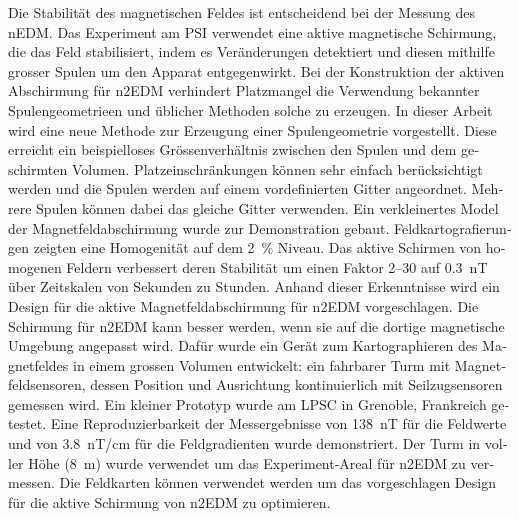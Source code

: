 \begin{otherlanguage}{german}
Die Stabilität des magnetischen Feldes ist entscheidend bei der Messung des nEDM\@.
Das Experiment am PSI verwendet eine aktive magnetische Schirmung, die das Feld stabilisiert, indem es Veränderungen detektiert und diesen mithilfe grosser Spulen um den Apparat entgegenwirkt.
Bei der Konstruktion der aktiven Abschirmung für n2EDM verhindert Platzmangel die Verwendung bekannter Spulengeometrieen und üblicher Methoden solche zu erzeugen.
In dieser Arbeit wird eine neue Methode zur Erzeugung einer Spulengeometrie vorgestellt. Diese erreicht ein beispielloses Grössenverhältnis zwischen den Spulen und dem geschirmten Volumen.
Platzeinschränkungen können sehr einfach berücksichtigt werden und die Spulen werden auf einem vordefinierten Gitter angeordnet. Mehrere Spulen können dabei das gleiche Gitter verwenden.
Ein verkleinertes Model der Magnetfeldabschirmung wurde zur Demonstration gebaut. Feldkartografierungen zeigten eine Homogenität auf dem \SI{2}{\percent} Niveau.
Das aktive Schirmen von homogenen Feldern verbessert deren Stabilität um einen Faktor 2--30 auf \SI{0.3}{nT} über  Zeitskalen von Sekunden zu Stunden.
Anhand dieser Erkenntnisse wird ein Design für die aktive Magnetfeldabschirmung für n2EDM vorgeschlagen.
Die Schirmung für n2EDM kann besser werden, wenn sie auf die dortige magnetische Umgebung angepasst wird.
Dafür wurde ein Gerät zum Kartographieren des Magnetfeldes in einem grossen Volumen entwickelt: ein fahrbarer Turm mit Magnetfeldsensoren, dessen Position und Ausrichtung kontinuierlich mit Seilzugsensoren gemessen wird.
Ein kleiner Prototyp wurde am LPSC in Grenoble, Frankreich getestet. Eine Reproduzierbarkeit der Messergebnisse von \SI{138}{nT} für die Feldwerte und von \SI{3.8}{nT/cm} für die Feldgradienten wurde demonstriert.
Der Turm in voller Höhe  (\SI{8}{m}) wurde verwendet um das Experiment-Areal für n2EDM zu vermessen.
Die Feldkarten können verwendet werden um das vorgeschlagen Design für die aktive Schirmung von n2EDM zu optimieren.



\end{otherlanguage}
